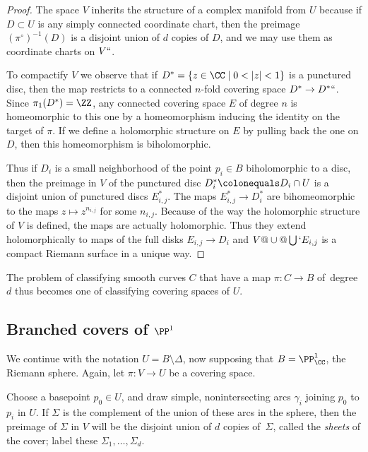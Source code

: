 \begin{proof}
The space $V$ inherits the structure of a complex manifold from $U$
because if $D \subset U$ is any simply connected coordinate chart,
then the preimage $({\pi^\circ})^{-1}(D)$ is a disjoint union of $d$
copies of $D$, and we may use them as coordinate charts on $V` `$.

To compactify $V$ we observe that if $D^* = \{ z \in \CC \mid 0 < |z|
< 1 \}$ is a punctured disc, then
the map 
restricts to a connected $n$-fold covering
space $D^*\to D^*` `$.
Since $\pi_1(D^*) = \ZZ$, any connected covering space $E$ of degree $n$
is homeomorphic to this one
by a homeomorphism inducing the identity on the target of $\pi$.
If we  define a holomorphic structure on $E$ by pulling back the one on
$D$, then
this homeomorphism is biholomorphic.

Thus if $D_i$ is a small neighborhood of the point $p_i \in B$
biholomorphic to a disc, then the preimage  in $V$ of the punctured
disc $D_i^* \colonequals  D_i \cap U$ is a disjoint union of punctured discs
$E_{i,j}^{*}$. The maps $E^{*}_{i,j} \to D_{i}^{*}$
are bihomeomorphic to the maps $z\mapsto z^{n_{i,j}}$ 
for some
$n_{i,j}$. Because of the way the holomorphic structure
of $V$ is defined, the maps 
are actually
holomorphic. Thus they extend holomorphically
to maps of the full disks $E_{i,j}\to D_{i}$ and $V@\cup@ \bigcup` E_{i,j}$
is a compact Riemann surface in a unique way.
\end{proof}

The problem of classifying smooth curves $C$ that have a map $\pi : C \to B$
of~degree $d$ thus becomes one of classifying covering spaces of $U$.
%

\subsection*{Branched covers of $\PP^1$}

We continue with the notation $U = B\setminus \Delta$, now supposing
that $B = \PP^1_\CC$, the Riemann sphere. Again, let $\pi:V\to U$ be a
covering space.

Choose a basepoint $p_0 \in U$, and draw simple, nonintersecting arcs
$\gamma_i$ joining $p_0$ to $p_i$ in $U$. If $\Sigma$ is the complement
of the union of these arcs in the sphere, then the preimage of $\Sigma$
in $V$ will be the disjoint union of $d$ copies of~$\Sigma$, called the
%
\emph{sheets} of the cover; label these $\Sigma_1,\dots,\Sigma_d$.

